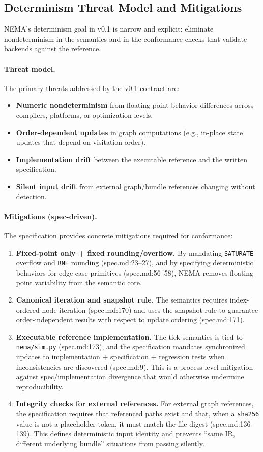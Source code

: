 \subsection{Determinism Threat Model and Mitigations}
\label{sec:determinism}
NEMA’s determinism goal in v0.1 is narrow and explicit: eliminate nondeterminism in the semantics and in the conformance checks that validate backends against the reference.

\paragraph{Threat model.}
The primary threats addressed by the v0.1 contract are:
\begin{itemize}
\item \textbf{Numeric nondeterminism} from floating-point behavior differences across compilers, platforms, or optimization levels.
\item \textbf{Order-dependent updates} in graph computations (e.g., in-place state updates that depend on visitation order).
\item \textbf{Implementation drift} between the executable reference and the written specification.
\item \textbf{Silent input drift} from external graph/bundle references changing without detection.
\end{itemize}

\paragraph{Mitigations (spec-driven).}
The specification provides concrete mitigations required for conformance:
\begin{enumerate}
\item \textbf{Fixed-point only + fixed rounding/overflow.} By mandating \texttt{SATURATE} overflow and \texttt{RNE} rounding (spec.md:23–27), and by specifying deterministic behaviors for edge-case primitives (spec.md:56–58), NEMA removes floating-point variability from the semantic core.
\item \textbf{Canonical iteration and snapshot rule.} The semantics requires index-ordered node iteration (spec.md:170) and uses the snapshot rule to guarantee order-independent results with respect to update ordering (spec.md:171).
\item \textbf{Executable reference implementation.} The tick semantics is tied to \texttt{nema/sim.py} (spec.md:173), and the specification mandates synchronized updates to implementation + specification + regression tests when inconsistencies are discovered (spec.md:9). This is a process-level mitigation against spec/implementation divergence that would otherwise undermine reproducibility.
\item \textbf{Integrity checks for external references.} For external graph references, the specification requires that referenced paths exist and that, when a \texttt{sha256} value is not a placeholder token, it must match the file digest (spec.md:136–139). This defines deterministic input identity and prevents “same IR, different underlying bundle” situations from passing silently.
\end{enumerate}

